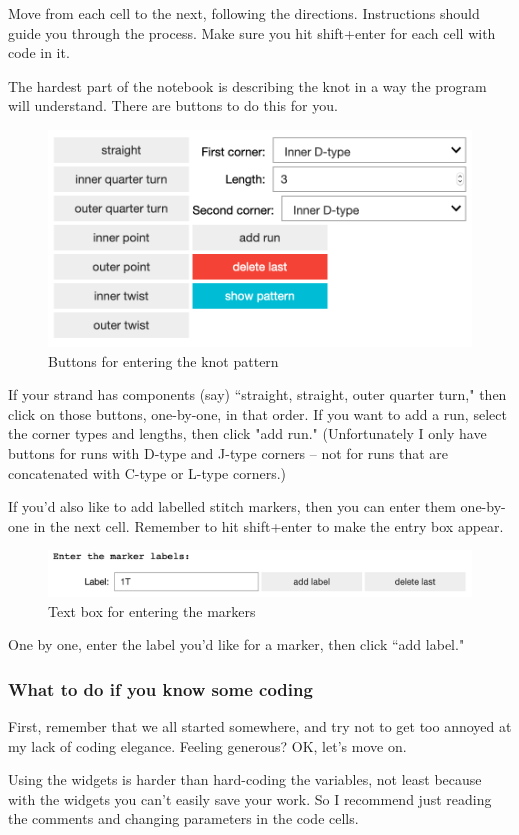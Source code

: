 \documentclass[openany]{book}
\begin{document}
 Move from each cell to the next, following the directions. Instructions should guide you through the process. Make sure you hit shift+enter for each cell with code in it.\medskip

The hardest part of the notebook is describing the knot in a way the program will understand. There are buttons to do this for you.


\begin{figure}[H]\centering
\includegraphics[width=.5\textwidth]{pic/buttons}
\caption{Buttons for entering the knot pattern}
\end{figure}

If your strand has components (say) ``straight, straight, outer quarter turn," then click on those buttons, one-by-one, in that order. If you want to add a run, select the corner types and lengths, then click "add run." (Unfortunately I only have buttons for runs with D-type and J-type corners -- not for runs that are concatenated with C-type or L-type corners.)

If you'd also like to add labelled stitch markers, then you can enter them one-by-one in the next cell. Remember to hit shift+enter to make the entry box appear.

\begin{figure}[H]\centering
\includegraphics[width=.75\textwidth]{pic/markers}
\caption{Text box for entering the markers}
\end{figure}

One by one, enter the label you'd like for a marker, then click ``add label." 

\subsubsection{What to do if you know some coding}
First, remember that we all started somewhere, and try not to get too annoyed at my lack of coding elegance. Feeling generous? OK, let's move on.\medskip

Using the widgets is harder than hard-coding the variables, not least because with the widgets you can't easily save your work. So I recommend just reading the comments and changing parameters in the code cells.
\end{document}
